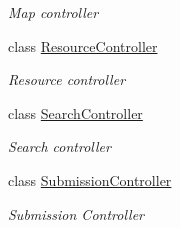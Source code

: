 \begin{DoxyCompactItemize}
\begin{DoxyCompactList}\small\item\em Map controller \end{DoxyCompactList}\item 
class \mbox{\hyperlink{class_ox_tots_1_1_controllers_1_1_resource_controller}{Resource\+Controller}}
\begin{DoxyCompactList}\small\item\em Resource controller \end{DoxyCompactList}\item 
class \mbox{\hyperlink{class_ox_tots_1_1_controllers_1_1_search_controller}{Search\+Controller}}
\begin{DoxyCompactList}\small\item\em Search controller \end{DoxyCompactList}\item 
class \mbox{\hyperlink{class_ox_tots_1_1_controllers_1_1_submission_controller}{Submission\+Controller}}
\begin{DoxyCompactList}\small\item\em Submission Controller \end{DoxyCompactList}\end{DoxyCompactItemize}
